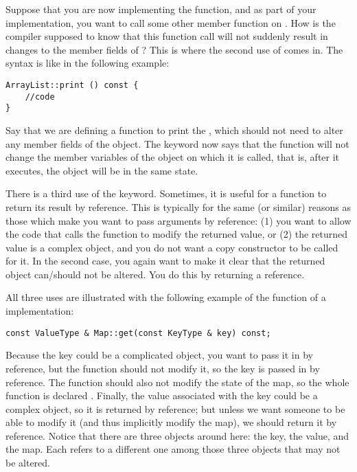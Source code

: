 Suppose that you are now implementing the  function,
and as part of your implementation,
you want to call some other member function on . 
How is the compiler supposed to know that this function call will not
suddenly result in changes to the member fields of ?
This is where the second use of  comes in.
The syntax is like in the following example:

\begin{verbatim}
ArrayList::print () const {
    //code
}
\end{verbatim}
Say that we are defining a function to print the ,
which should not need to alter any member fields of the object.
The  keyword now says that the function
 will not change the member variables of the object on
which it is called, that is, after it executes, the object will be in
the same state. 

There is a third use of the  keyword.
Sometimes, it is useful for a function to return its result by
reference.
This is typically for the same (or similar) reasons as those which
make you want to pass arguments by reference:
(1) you want to allow the code that calls the function to modify the
returned value, or
(2) the  returned value is a complex object, and you do not want a copy
constructor to be called for it.
In the second case, you again want to make it clear that the returned
object can/should not be altered.
You do this by returning a  reference.

All three uses are illustrated with the following example of the
 function of a  implementation:

\begin{verbatim}
const ValueType & Map::get(const KeyType & key) const;
\end{verbatim}

Because the key could be a complicated object,
you want to pass it in by reference, but the  function
should not modify it, so the key is passed in by  reference.
The  function should also not modify the state of the map,
so the whole function is declared .
Finally, the value associated with the key could be a complex object,
so it is returned by reference;
but unless we want someone to be able to modify it
(and thus implicitly modify the map),
we should return it by  reference.
Notice that there are three objects around here:
the key, the value, and the map.
Each  refers to a different one among those three objects that
may not be altered.

